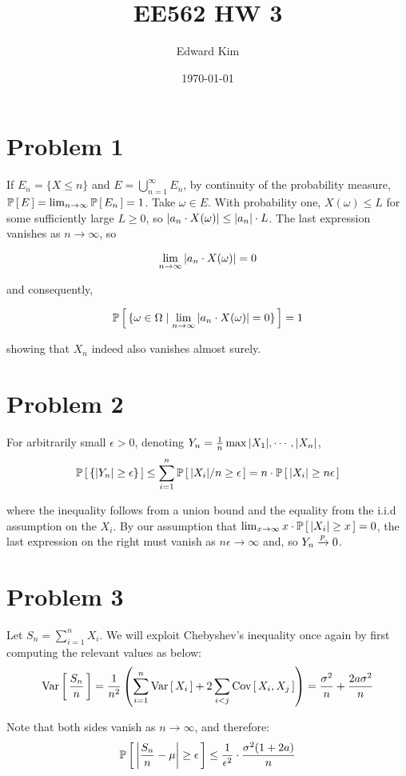 \documentclass[12pt]{article}%
\title{EE562 HW 3}
\author{Edward Kim}
\date{\today}
\begin{document}
\maketitle
\section{Problem 1}
If $E_n = \{X \leq n\}$ and $E = \bigcup_{n = 1}^\infty E_n$, by continuity of the probability measure, $\mathbb{P}\left[\,E\,\right] = \lim_{n \rightarrow \infty} \mathbb{P}\left[\,E_n\,\right] = 1$. Take $\omega \in E$. With probability one, $X(\omega) \leq L$ for some sufficiently large $L \geq 0$, so $\abs{a_n\cdot X(\omega)} \leq \abs{a_n} \cdot L$. The last expression vanishes as $n \rightarrow \infty$, so

\[ \lim_{n \rightarrow \infty} \abs{a_n\cdot X(\omega)} = 0  \]

and consequently,

\[ \mathbb{P}\left[\,\{\omega \in \Omega \mid \lim_{n \rightarrow \infty} \abs{a_n\cdot X(\omega)} = 0\}\,\right] = 1 \]

showing that $X_n$ indeed also vanishes almost surely.

\section{Problem 2}
For arbitrarily small $\epsilon > 0$, denoting $Y_n = \frac{1}{n} \max{\abs{X_1},\cdots,\abs{X_n}}$,
\[ \mathbb{P}\left[\,\{\abs{Y_n} \geq \epsilon \}\,\right] \leq \sum_{i = 1}^n \mathbb{P}\left[\,\abs{X_i}/n \geq \epsilon\,\right] = n \cdot \mathbb{P}\left[\,\abs{X_i} \geq n\epsilon\,\right] \]

where the inequality follows from a union bound and the equality from the i.i.d assumption on the $X_i$. By our assumption that $\lim_{x \rightarrow \infty} x\cdot \mathbb{P}\left[\,\abs{X_i} \geq x\,\right] = 0$, the last expression on the right must vanish as $n\epsilon \rightarrow \infty$ and, so $Y_n \xrightarrow[]{p} 0$.

\section{Problem 3}
Let $S_n = \sum_{i = 1}^n X_i$. We will exploit Chebyshev's inequality once again by first computing the relevant values as below:
%
\[ \text{Var}\left[\,\frac{S_n}{n}\,\right] = \frac{1}{n^2}\left(\sum_{i = 1}^n \text{Var}\left[\,X_i\,\right] + 2 \sum_{i < j} \text{Cov}\left[\,X_i,X_j\,\right] \right) = \frac{\sigma^2}{n} + \frac{2a\sigma^2}{n} \]

Note that both sides vanish as $n \rightarrow \infty$, and therefore:
\[ \mathbb{P}\left[\,\abs{\frac{S_n}{n} - \mu} \geq \epsilon\,\right] \leq \frac{1}{\epsilon^2} \cdot \frac{\sigma^2(1 + 2a)}{n} \]
\end{document}
